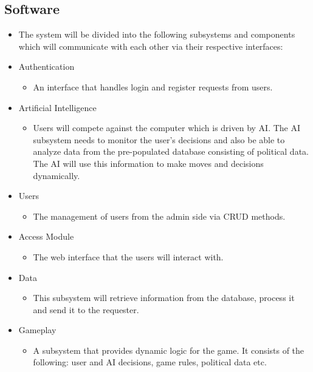 \documentclass{article}
\begin{document}
    \subsection{Software}
    \begin{itemize}
    \item The system will be divided into the following subsystems and components which will communicate with each other via their respective interfaces:

    	\item Authentication  
	    \begin{itemize}
				\item An interface that handles login and register requests from users.
		\end{itemize}

		\item Artificial Intelligence 
   		\begin{itemize}
				\item Users will compete against the computer which is driven by AI. The AI subsystem needs to monitor the user's decisions and also be able to analyze data from the pre-populated database consisting of political data. The AI will use this information to make moves and decisions dynamically.
		\end{itemize}

		\item Users 
		\begin{itemize}
				\item The management of users from the admin side via CRUD methods.   		
		\end{itemize}

		\item Access Module 
		\begin{itemize}
				\item The web interface that the users will interact with.		
		\end{itemize}

		\item Data
		\begin{itemize}
				\item This subsystem will retrieve information from the database, process it and send it to the requester.
		\end{itemize}

		\item Gameplay
		\begin{itemize}
				\item A subsystem that provides dynamic logic for the game. It consists of the following: user and AI decisions, game rules, political data etc.
		\end{itemize}
	\end{itemize}
\end{document}
